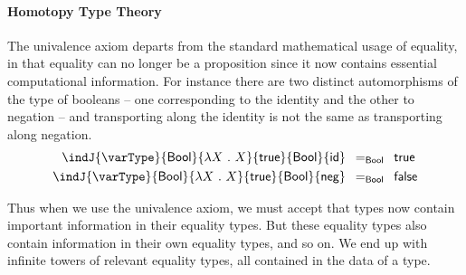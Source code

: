 \paragraph*{Homotopy Type Theory}
% 
The univalence axiom departs from the standard mathematical usage of equality, 
in that equality can no longer be a proposition since it now contains essential
computational information. 
% 
For instance there are two distinct automorphisms of the type of booleans 
-- one corresponding to the identity and the other to negation -- and transporting along
the identity is not the same as transporting along negation.
\[
\begin{split}
\indJ{\varType}{\mathsf{Bool}}{\lambda X\ .\ X}{\mathsf{true}}{\mathsf{Bool}}{\mathsf{id}} & \enskip =_{\mathsf{Bool}} \enskip \mathsf{true} \\
\indJ{\varType}{\mathsf{Bool}}{\lambda X\ .\ X}{\mathsf{true}}{\mathsf{Bool}}{\mathsf{neg}} & \enskip =_{\mathsf{Bool}} \enskip \mathsf{false}
\end{split}
\]

Thus when we use the univalence axiom, we must accept that types now contain 
important information in their equality types. 
% 
But these equality types also contain information in their own equality types,
and so on. 
% 
We end up with infinite towers of relevant equality types, all contained in the
data of a type.

